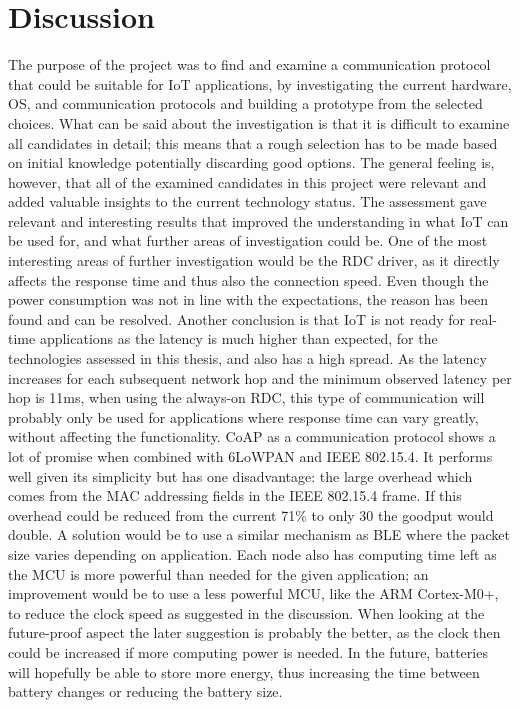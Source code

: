\section{Discussion}

The purpose of the project was to find and examine a communication protocol that could be suitable for IoT applications,
	by investigating the current hardware,
	OS,
	and communication protocols and building a prototype from the selected choices.
What can be said about the investigation is that it is difficult to examine all candidates in detail;
	this means that a rough selection has to be made based on initial knowledge potentially discarding good options.
The general feeling is,
	however,
	that all of the examined candidates in this project were relevant and added valuable insights to the current technology status.
The assessment gave relevant and interesting results that improved the understanding in what IoT can be used for,
	and what further areas of investigation could be.
One of the most interesting areas of further investigation would be the RDC driver,
	as it directly affects the response time and thus also the connection speed.
Even though the power consumption was not in line with the expectations,
	the reason has been found and can be resolved.
Another conclusion is that IoT is not ready for real-time applications as the latency is much higher than expected,
	for the technologies assessed in this thesis,
	and also has a high spread.
As the latency increases for each subsequent network hop and the minimum observed latency per hop is 11ms,
	when using the always-on RDC,
	this type of communication will probably only be used for applications where response time can vary greatly,
	without affecting the functionality.
CoAP as a communication protocol shows a lot of promise when combined with 6LoWPAN and IEEE 802.15.4.
It performs well given its simplicity but has one disadvantage:
	the large overhead which comes from the MAC addressing fields in the IEEE 802.15.4 frame.
If this overhead could be reduced from the current 71\% to only 30%
	the goodput would double.
A solution would be to use a similar mechanism as BLE where the packet size varies depending on application.
Each node also has computing time left as the MCU is more powerful  than needed for the given application;
	an improvement would be to use a less powerful MCU,
	like the ARM Cortex-M0+,
	to reduce the clock speed as suggested in the discussion.
When looking at the future-proof aspect the later suggestion is probably the better,
	as the clock then could be increased if more computing power is needed.
In the future,
	batteries will hopefully be able to store more energy,
	thus increasing the time between battery changes or reducing the battery size.

